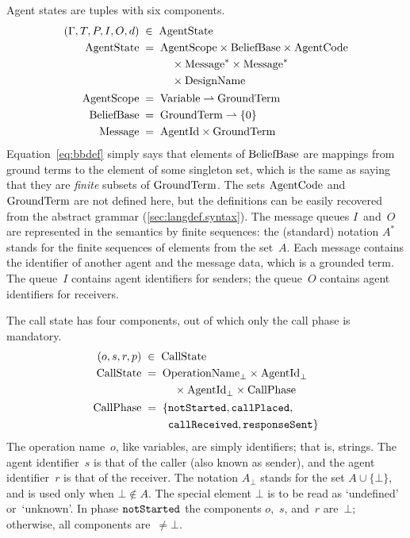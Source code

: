 \documentclass[a4paper,12pt,oneside,fleqn]{book} %
\newcommand{\pmap}{\rightharpoonup}
\begin{document}
{Agent states are tuples with six components.
\begin{align}
(\Gamma, T, P, I, O,d) &\;\in\; {\rm AgentState}
\\
{\rm AgentState} &\;=\;
  \begin{aligned}[t]
    &{\rm AgentScope} \times{\rm BeliefBase} \times{\rm AgentCode} \\
    &\quad\times{\rm Message}^* \times{\rm Message}^* \\
    &\quad\times{\rm DesignName}
  \end{aligned}
\\
{\rm AgentScope} &\;=\; {\rm Variable}\pmap{\rm GroundTerm}
\\
{\rm BeliefBase} &\;=\; {\rm GroundTerm}\pmap\{0\} \label{eq:bbdef}
\\
{\rm Message} &\;=\; {\rm AgentId}\times{\rm GroundTerm}
\end{align}
Equation~\eqref{eq:bbdef} simply says that elements of ${\rm BeliefBase}$
are mappings from ground terms to the element of some singleton set, which
is the same as saying that they are \emph{finite} subsets of ${\rm
GroundTerm}$. The sets ${\rm AgentCode}$ and ${\rm GroundTerm}$ are not
defined here, but the definitions can be easily recovered from the abstract
grammar (\autoref{sec:langdef.syntax}). The message queues $I$~and~$O$ are
represented in the semantics by finite sequences: the (standard) notation
$A^*$ stands for the finite sequences of elements from the set~$A$. Each
message contains the identifier of another agent and the message data,
which is a grounded term. The queue~$I$ contains agent identifiers for
senders; the queue~$O$ contains agent identifiers for receivers.

The call state has four components, out of which only the call phase is
mandatory.
\begin{align}
(o,s,r,p) &\;\in\; {\rm CallState}
\\
{\rm CallState} &\;=\;
  \begin{aligned}[t]
  &{\rm OperationName}_\bot\times{\rm AgentId}_\bot \\
  &\quad\times{\rm AgentId}_\bot\times{\rm CallPhase}
  \end{aligned}
\\
{\rm CallPhase} &\;=\;
  \begin{aligned}[t]
  \{  &{\tt notStarted}, {\tt callPlaced},\\
      &{\tt callReceived}, {\tt responseSent} \}
  \end{aligned}
\end{align}
The operation name~$o$, like variables, are simply identifiers; that is,
strings. The agent identifier~$s$ is that of the caller (also known as
sender), and the agent identifier~$r$ is that of the receiver. The notation
$A_\bot$ stands for the set $A\cup\{\bot\}$, and is used only when
$\bot\notin A$. The special element $\bot$ is to be read as `undefined'
or~`unknown'. In phase ${\tt notStarted}$ the components $o$,~$s$, and~$r$
are~$\bot$; otherwise, all components are~$\ne\bot$.

}
\end{document}
